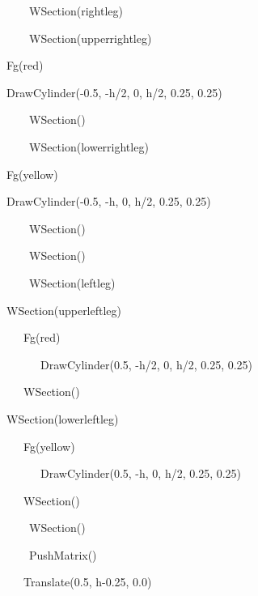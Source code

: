 \documentclass[letterpaper]{article}
\begin{document}
{\sffamily
\ \ \ \ \ \ WSection({\textquotedbl}rightleg{\textquotedbl})}

{\sffamily
\ \ \ \ \ \ WSection({\textquotedbl}upperrightleg{\textquotedbl})}

{\sffamily
\ \  Fg({\textquotedbl}red{\textquotedbl})}

{\sffamily
\ \  DrawCylinder(-0.5, -h/2, 0, h/2, 0.25, 0.25)}

{\sffamily
\ \ \ \ \ \ WSection()}

{\sffamily
\ \ \ \ \ \ WSection({\textquotedbl}lowerrightleg{\textquotedbl})}

{\sffamily
\ \  Fg({\textquotedbl}yellow{\textquotedbl})}

{\sffamily
\ \  DrawCylinder(-0.5, -h, 0, h/2, 0.25, 0.25)}

{\sffamily
\ \ \ \ \ \ WSection()}

{\sffamily
\ \ \ \ \ \ WSection()}

{\sffamily
\ \ \ \ \ \ WSection({\textquotedbl}leftleg{\textquotedbl})}

{\sffamily
\ \  WSection({\textquotedbl}upperleftleg{\textquotedbl})\ \ }

{\sffamily
\ \  \ \ \ Fg({\textquotedbl}red{\textquotedbl})}

{\sffamily
\ \ \ \ \  \ \ \ DrawCylinder(0.5, -h/2, 0, h/2, 0.25, 0.25)}

{\sffamily
\ \ \ \ \  WSection()}

{\sffamily
\ \  WSection({\textquotedbl}lowerleftleg{\textquotedbl})\ \ }

{\sffamily
\ \  \ \ \ Fg({\textquotedbl}yellow{\textquotedbl})}

{\sffamily
\ \ \ \ \  \ \ \ DrawCylinder(0.5, -h, 0, h/2, 0.25, 0.25)}

{\sffamily
\ \ \ \ \  WSection()}

{\sffamily
\ \ \ \ \ \ WSection()}

{\sffamily
\ \ \ \ \ \ PushMatrix()}

{\sffamily
\ \ \ \ \  Translate(0.5, h-0.25, 0.0)}
\end{document}
